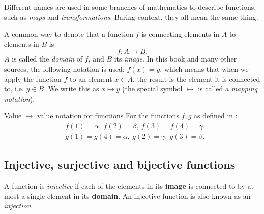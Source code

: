 Different names are used in some branches of mathematics to describe functions, such as \emph{maps} and \emph{transformations}. Baring context, they all mean the same thing.

A common way to denote that a function $f$ is connecting elements in $A$ to elements in $B$ is
\begin{equation}
	f: A\to B.
	\label{eq:function_basics}
\end{equation}
$A$ is called the \emph{domain} of $f$, and $B$ its \emph{image}. In this book and many other sources, the following notation is used: $f(x)=y$, which means that when we apply the function $f$ to an element $x\in A$, the result is the element it is connected to, i.e. $y\in B$. We write this as $x\mapsto y$ (the special symbol $\mapsto$ is called a \emph{mapping notation}).

\begin{example}{Value $\mapsto$ value notation for functions}{}
	For the functions $f,g$ as defined in :
	\begin{align*}
		&f(1)=\alpha,\ f(2)=\beta,\ f(3)=f(4)=\gamma.\\
		&g(1)=g(4)=\alpha,\ g(2)=\gamma,\ g(3)=\beta.
	\end{align*}
\end{example}

\subsection{Injective, surjective and bijective functions}
A function is \emph{injective} if each of the elements in its \textbf{image} is connected to by at most a single element in its \textbf{domain}. An injective function is also known as an \emph{injection}.

